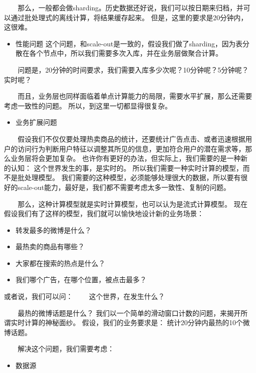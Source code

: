   那么，一般都会做sharding。历史数据还好说，我们可以按日期来归档，并可以通过批处理式的离线计算，将结果缓存起来。
但是，这里的要求是20分钟内，这很难。

\begin{itemize}
\item
  性能问题
  这个问题，和scale-out是一致的，假设我们做了sharding，因为表分散在各个节点中，所以我们需要多次入库，并在业务层做聚合计算。
\end{itemize}

  问题是，20分钟的时间要求，我们需要入库多少次呢？10分钟呢？5分钟呢？实时呢？

  而且，业务层也同样面临着单点计算能力的局限，需要水平扩展，那么还需要考虑一致性的问题。
所以，到这里一切都显得很复杂。

\begin{itemize}
\item
  业务扩展问题
\end{itemize}

  假设我们不仅仅要处理热卖商品的统计，还要统计广告点击、或者迅速根据用户的访问行为判断用户特征以调整其所见的信息，更加符合用户的潜在需求等，那么业务层将会更加复杂。
也许你有更好的办法，但实际上，我们需要的是一种新的认知：
这个世界发生的事，是实时的。
所以我们需要一种实时计算的模型，而不是批处理模型。
我们需要的这种模型，必须能够处理很大的数据，所以要有很好的scale-out能力，最好是，我们都不需要考虑太多一致性、复制的问题。

  那么，这种计算模型就是实时计算模型，也可以认为是流式计算模型。
现在假设我们有了这样的模型，我们就可以愉快地设计新的业务场景：

\begin{itemize}
\item
  转发最多的微博是什么？
\item
  最热卖的商品有哪些？
\item
  大家都在搜索的热点是什么？
\item
  我们哪个广告，在哪个位置，被点击最多？
\end{itemize}

或者说，我们可以问：   这个世界，在发生什么？

  最热的微博话题是什么？
我们以一个简单的滑动窗口计数的问题，来揭开所谓实时计算的神秘面纱。
假设，我们的业务要求是： 统计20分钟内最热的10个微博话题。

  解决这个问题，我们需要考虑：

\begin{itemize}
\item
  数据源
\end{itemize}

